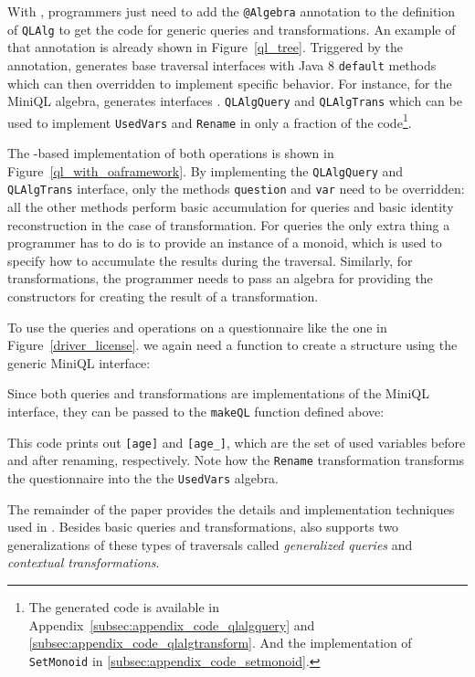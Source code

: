 With \Name, programmers just need to add the \lstinline{@Algebra} annotation
to the definition of \lstinline{QLAlg} to get the code for generic
queries and transformations. An example of that annotation is already
shown in Figure~\ref{ql_tree}.
Triggered by the annotation, \name generates base traversal interfaces with Java 8 \lstinline{default} methods which can then overridden to implement specific behavior.
For instance, for the MiniQL algebra, \name generates interfaces . 
\lstinline{QLAlgQuery} and
\lstinline{QLAlgTrans} which can be used to implement \lstinline{UsedVars} and \lstinline{Rename} in only a fraction of the code\footnote{The generated code is available in Appendix~\ref{subsec:appendix_code_qlalgquery} and \ref{subsec:appendix_code_qlalgtransform}. And the implementation of \lstinline{SetMonoid} in \ref{subsec:appendix_code_setmonoid}.}.

The \name-based implementation of both operations is shown in Figure~\ref{ql_with_oaframework}.  
By implementing the
\lstinline{QLAlgQuery} and \lstinline{QLAlgTrans} interface, only the methods
\lstinline{question} and \lstinline{var} need to be overridden: all the other methods perform basic accumulation for queries and basic identity reconstruction in the case of transformation. 
For queries the
only extra thing a programmer has to do is to provide an instance of a
monoid, which is used to specify how to accumulate the results during
the traversal. Similarly, for transformations, the programmer needs to
pass an algebra for providing the constructors for creating the result of a transformation.

To use the queries and operations on a questionnaire like the one in Figure~\ref{driver_license}. we again need a function to create a structure using the generic MiniQL interface: 


Since both queries and transformations are implementations of the MiniQL interface, they can be passed to the \lstinline{makeQL} function defined above:

This code prints out  \lstinline{[age]} and \lstinline{[age_]}, which
are the set of used variables before and after renaming, respectively.
Note how the \lstinline{Rename} transformation transforms the questionnaire into the the \lstinline{UsedVars} algebra. 

The remainder of the paper provides the details and implementation
techniques used in \Name. Besides basic queries and transformations,
\name also supports two generalizations of these types of traversals
called \emph{generalized queries} and \emph{contextual transformations}.

